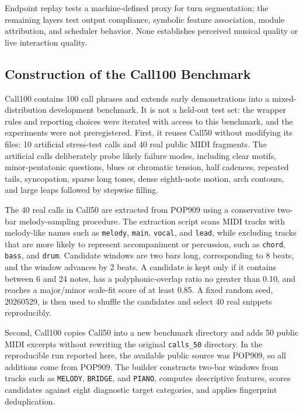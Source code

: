 \documentclass[11pt,a4paper]{article}
\begin{document}
Endpoint replay tests a machine-defined proxy for turn segmentation; the remaining layers test output compliance, symbolic feature association, module attribution, and scheduler behavior. None establishes perceived musical quality or live interaction quality.

\subsection{Construction of the Call100 Benchmark}
\label{subsec:call100-dataset}

Call100 contains 100 call phrases and extends early demonstrations into a mixed-distribution development benchmark. It is not a held-out test set: the wrapper rules and reporting choices were iterated with access to this benchmark, and the experiments were not preregistered. First, it reuses Call50 without modifying its files: 10 artificial stress-test calls and 40 real public MIDI fragments. The artificial calls deliberately probe likely failure modes, including clear motifs, minor-pentatonic questions, blues or chromatic tension, half cadences, repeated tails, syncopation, sparse long tones, dense eighth-note motion, arch contours, and large leaps followed by stepwise filling.

The 40 real calls in Call50 are extracted from POP909 \citep{wang2020pop909} using a conservative two-bar melody-sampling procedure. The extraction script scans MIDI tracks with melody-like names such as \texttt{melody}, \texttt{main}, \texttt{vocal}, and \texttt{lead}, while excluding tracks that are more likely to represent accompaniment or percussion, such as \texttt{chord}, \texttt{bass}, and \texttt{drum}. Candidate windows are two bars long, corresponding to 8 beats, and the window advances by 2 beats. A candidate is kept only if it contains between 6 and 24 notes, has a polyphonic-overlap ratio no greater than 0.10, and reaches a major/minor scale-fit score of at least 0.85. A fixed random seed, 20260529, is then used to shuffle the candidates and select 40 real snippets reproducibly.

Second, Call100 copies Call50 into a new benchmark directory and adds 50 public MIDI excerpts without rewriting the original \texttt{calls\_50} directory. In the reproducible run reported here, the available public source was POP909, so all additions come from POP909. The builder constructs two-bar windows from tracks such as \texttt{MELODY}, \texttt{BRIDGE}, and \texttt{PIANO}, computes descriptive features, scores candidates against eight diagnostic target categories, and applies fingerprint deduplication.
\end{document}
